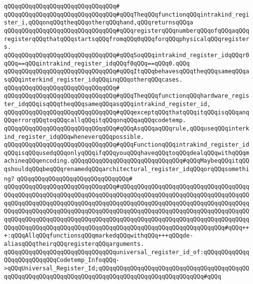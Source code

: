 \verb|qQQqqQQqqQQqqQQqqQQqqQQqqQQqqQQq#|\newline
\verb|qQQqqQQqqQQqqQQqqQQqqQQqqQQqqQQq#qQQqTheqQQqfunctionqQQqintrakind_register_i,qQQqonqQQqtheqQQqotherqQQqhand,qQQqreturnsqQQqa|\newline
\verb|qQQqqQQqqQQqqQQqqQQqqQQqqQQqqQQq#qQQqregisterqQQqnumberqQQqofqQQqaqQQqregisterqQQqthatqQQqstartsqQQqfromqQQq0qQQqforqQQqphysicalqQQqregisters.|\newline
\verb|qQQqqQQqqQQqqQQqqQQqqQQqqQQqqQQq#qQQqSoqQQqintrakind_register_idqQQqr0qQQq==qQQqintrakind_register_idqQQqf0qQQq==qQQq0.qQQq|\newline
\verb|qQQqqQQqqQQqqQQqqQQqqQQqqQQqqQQq#qQQqItqQQqbehavesqQQqtheqQQqsameqQQqasqQQqinterkind_register_idqQQqinqQQqotherqQQqcases.|\newline
\verb|qQQqqQQqqQQqqQQqqQQqqQQqqQQqqQQq#|\newline
\verb|qQQqqQQqqQQqqQQqqQQqqQQqqQQqqQQq#qQQqTheqQQqfunctionqQQqhardware_register_idqQQqisqQQqtheqQQqsameqQQqasqQQqintrakind_register_id,|\newline
\verb|qQQqqQQqqQQqqQQqqQQqqQQqqQQqqQQq#qQQqexceptqQQqthatqQQqitqQQqisqQQqanqQQqerrorqQQqtoqQQqcallqQQqitqQQqonqQQqaqQQqcodetemp.|\newline
\verb|qQQqqQQqqQQqqQQqqQQqqQQqqQQqqQQq#qQQqAsqQQqaqQQqrule,qQQquseqQQqinterkind_register_idqQQqwheneverqQQqpossible.|\newline
\verb|qQQqqQQqqQQqqQQqqQQqqQQqqQQqqQQq#qQQqFunctionqQQqintrakind_register_idqQQqisqQQqusedqQQqonlyqQQqifqQQqyouqQQqhaveqQQqtoqQQqdealqQQqwithqQQqmachineqQQqencoding.qQQqqQQqqQQqqQQqqQQqqQQqqQQqqQQq#qQQqMaybeqQQqitqQQqshouldqQQqbeqQQqrenamedqQQqarchitectural_register_idqQQqorqQQqsomething?|\newline
\verb|qQQqqQQqqQQqqQQqqQQqqQQqqQQqqQQq#|\newline
\verb|qQQqqQQqqQQqqQQqqQQqqQQqqQQqqQQq#qQQqqQQqqQQqqQQqqQQqqQQqqQQqqQQqqQQqqQQqqQQqqQQqqQQqqQQqqQQqqQQqqQQqqQQqqQQqqQQqqQQqqQQqqQQqqQQqqQQqqQQqqQQqqQQqqQQqqQQqqQQqqQQqqQQqqQQqqQQqqQQqqQQqqQQqqQQqqQQqqQQqqQQqqQQqqQQqqQQqqQQqqQQqqQQqqQQqqQQqqQQqqQQqqQQqqQQqqQQqqQQqqQQqqQQqqQQqqQQqqQQqqQQqqQQqqQQqqQQqqQQqqQQqqQQqqQQqqQQqqQQqqQQqqQQqqQQqqQQqqQQqqQQqqQQqqQQqqQQqqQQqqQQqqQQqqQQqqQQqqQQqqQQqqQQqqQQqqQQqqQQqqQQqqQQqqQQqqQQq#qQQq+++:qQQqAllqQQqfunctionsqQQqmarkedqQQqwithqQQq+++qQQqde-aliasqQQqtheirqQQqregisterqQQqarguments.|\newline
\verb|qQQqqQQqqQQqqQQqqQQqqQQqqQQqqQQquniversal_register_id_of:qQQqqQQqqQQqqQQqqQQqqQQqqQQqCodetemp_InfoqQQq->qQQqUniversal_Register_Id;qQQqqQQqqQQqqQQqqQQqqQQqqQQqqQQqqQQqqQQqqQQqqQQqqQQqqQQqqQQqqQQqqQQqqQQqqQQqqQQqqQQqqQQqqQQqqQQqqQQq#qQQq|\newline
